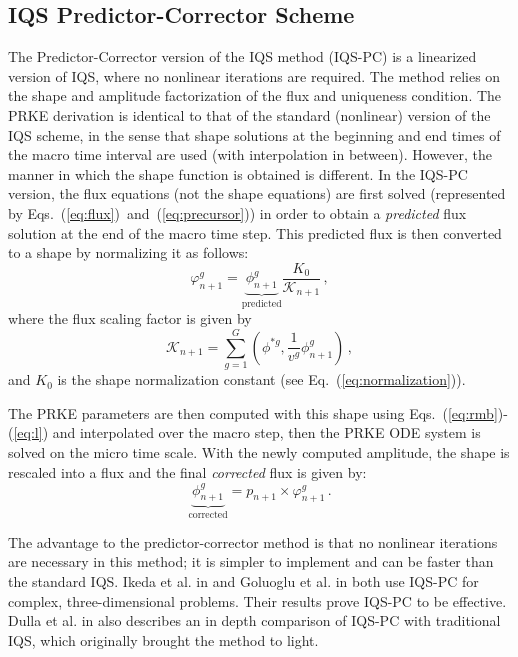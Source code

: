 \documentclass{elsarticle}
\newcommand{\eqt}[1]{Eq.~(\ref{#1})}                     %
\newcommand{\eqts}[2]{Eqs.~(\ref{#1})~and~(\ref{#2})}    %
\newcommand{\eqtss}[2]{Eqs.~(\ref{#1})-(\ref{#2})}       %
\newcommand{\iqspc}{IQS-PC\xspace}
\newcommand{\be}{\begin{equation}}
\newcommand{\ee}{\end{equation}}
\begin{document}
\subsection{IQS Predictor-Corrector Scheme}

The Predictor-Corrector version of the IQS method (\iqspc) is a linearized version of IQS, where no nonlinear iterations are required. 
The method relies on the shape and amplitude factorization of the flux and uniqueness condition. The PRKE derivation is 
identical to that of the standard (nonlinear) version of the IQS scheme, in the sense that shape solutions at the beginning 
and end times of the macro time interval are used (with interpolation in between).
However, the manner in which the shape function is obtained is different.  In the \iqspc version, the flux equations 
(not the shape equations) are first solved (represented by \eqts{eq:flux}{eq:precursor}) in order to obtain a 
{\it predicted} flux solution at the end of the macro time step. This predicted flux is then converted to a shape by 
normalizing it as follows:
\be
\varphi^g_{n+1} = \underbrace{\phi^g_{n+1}}_{\text{predicted}} \frac{K_0}{\mathcal{K}_{n+1}} \,,
\label{eq:rescale}
\ee
where the flux scaling factor is given by
\be
\mathcal{K}_{n+1} =\sum_{g=1}^G\left(\phi^{*g},\frac{1}{v^g}\phi^g_{n+1}\right) \,,
\ee
and $K_0$ is the shape normalization constant (see \eqt{eq:normalization}).

The PRKE parameters are then computed with this shape using \eqtss{eq:rmb}{eq:l} and interpolated over the macro step, then the 
PRKE ODE system is solved on the micro time scale.  With the newly computed amplitude, the shape is rescaled into a flux and the final 
{\it corrected} flux is given by:
\be
\underbrace{\phi^g_{n+1}}_{\text{corrected}} = p_{n+1} \times \varphi^g_{n+1} \,.
\ee

The advantage to the predictor-corrector method is that no nonlinear iterations are necessary in this method; it is simpler to 
implement and can be faster than the standard IQS.  Ikeda et al. in \cite{Ikeda_2001} and Goluoglu et al. in \cite{Goluoglu_2001} 
both use \iqspc for complex, three-dimensional problems.  Their results prove \iqspc to be effective.  Dulla et al. in \cite{Dulla2008} 
also describes an in depth comparison of \iqspc with traditional IQS, which originally brought the method to light.
\end{document}
